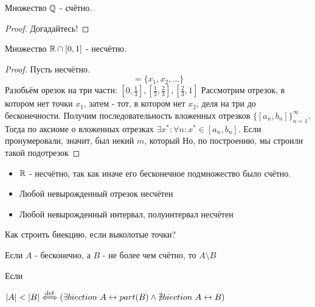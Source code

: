 \documentclass[12pt, a4paper]{article}
\begin{document}
    \begin{theorem}
      Множество ${\mathbb{Q}}$ - счётно.
    \end{theorem}
    \begin{proof}
      Догадайтесь!
    \end{proof}

    \begin{theorem}
      Множество ${\mathbb{R}} \cap [0, 1]$ - несчётно.
    \end{theorem}
    \begin{proof}
      Пусть несчётно.
      \begin{equation}
        [0, 1] = \{x_1, x_2, \ldots\}
      \end{equation}
      Разобьём орезок на три части: 
      $\left[0, \frac{1}{3}\right], \left[\frac{1}{3}, \frac{2}{3}\right], \left[\frac{2}{3}, 1\right]$
      Рассмотрим отрезок, в котором нет точки $x_1$, затем - тот, в котором нет $x_2$, деля на три до бесконечности.
      Получим последовательность вложенных отрезков $\{[a_n, b_n]\}^{\infty}_{n = 1}$.
      Тогда по аксиоме о вложенных отрезках $\exists x^{*}: \forall n: x^{*} \in [a_n, b_n]$.
      Если пронумеровали, значит, был некий $m$, который 
      Но, по построению, мы строили такой подотрезок 
    \end{proof}

    \begin{corollary}
      \begin{itemize}
        \item ${\mathbb{R}}$ - несчётно, так как иначе его бесконечное подмножество было счётно.
        \item Любой невырожденный отрезок несчётен
        \item Любой невырожденный интервал, полуинтервал несчётен
      \end{itemize}
    \end{corollary}

    Как строить биекцию, если выколотые точки?
    
    \begin{statement}
      Если $A$ - бесконечно, а $B$ - не более чем счётно, то $A \setminus B$
    \end{statement}

    \begin{property}
      Если
    \end{property}

    \begin{definition}[$|A| < |B|$]
      $|A| < |B| \overset{\mathrm{def}}{\Longleftrightarrow} (\exists biection ~ A \leftrightarrow part(B) \land \nexists biection ~ A \leftrightarrow B)$
      
    \end{definition}
\end{document}
